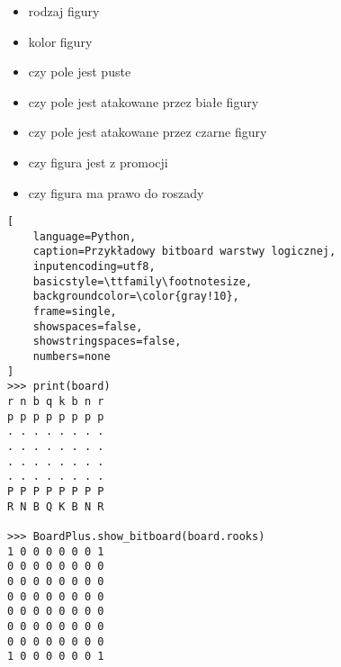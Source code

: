 \begin{itemize}
    \item rodzaj figury
    \item kolor figury
    \item czy pole jest puste
    \item czy pole jest atakowane przez białe figury
    \item czy pole jest atakowane przez czarne figury
    \item czy figura jest z promocji
    \item czy figura ma prawo do roszady
\end{itemize}

\vspace{0.5cm}

\begin{lstlisting}[
    language=Python,
    caption=Przykładowy bitboard warstwy logicznej,
    inputencoding=utf8,
    basicstyle=\ttfamily\footnotesize,
    backgroundcolor=\color{gray!10},
    frame=single,
    showspaces=false,
    showstringspaces=false,
    numbers=none
]
>>> print(board)
r n b q k b n r
p p p p p p p p
. . . . . . . .
. . . . . . . .
. . . . . . . .
. . . . . . . .
P P P P P P P P
R N B Q K B N R

>>> BoardPlus.show_bitboard(board.rooks)
1 0 0 0 0 0 0 1
0 0 0 0 0 0 0 0
0 0 0 0 0 0 0 0
0 0 0 0 0 0 0 0
0 0 0 0 0 0 0 0
0 0 0 0 0 0 0 0
0 0 0 0 0 0 0 0
1 0 0 0 0 0 0 1
\end{lstlisting}

